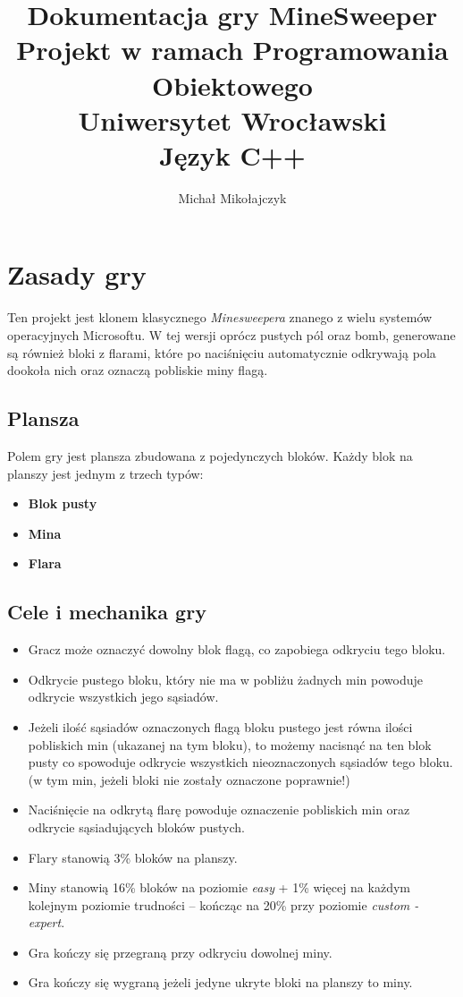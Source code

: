 \documentclass[12pt,a4paper]{article}
\begin{document}
\author{Michał Mikołajczyk}
\title{
	\textbf{Dokumentacja gry MineSweeper}\\
	\large Projekt w ramach Programowania Obiektowego\\
	\large Uniwersytet Wrocławski\\
	\large Język C++
	}

\maketitle

\tableofcontents
\newpage

\section{Zasady gry}
Ten projekt jest klonem klasycznego \textit{Minesweepera} znanego z wielu systemów operacyjnych Microsoftu. W tej wersji oprócz pustych pól oraz bomb, generowane są również bloki z flarami, które po naciśnięciu automatycznie odkrywają pola dookoła nich oraz oznaczą pobliskie miny flagą.
\subsection{Plansza}
Polem gry jest plansza zbudowana z pojedynczych bloków. Każdy blok na planszy jest jednym z trzech typów:
\begin{itemize}
\item \textbf{Blok pusty}
\item \textbf{Mina}
\item \textbf{Flara}
\end{itemize}

\subsection{Cele i mechanika gry}
\begin{itemize}
\item Gracz może oznaczyć dowolny blok flagą, co zapobiega odkryciu tego bloku.
\item Odkrycie pustego bloku, który nie ma w pobliżu żadnych min powoduje odkrycie wszystkich jego sąsiadów.
\item Jeżeli ilość sąsiadów oznaczonych flagą bloku pustego jest równa ilości pobliskich min (ukazanej na tym bloku), to możemy nacisnąć na ten blok pusty co spowoduje odkrycie wszystkich nieoznaczonych sąsiadów tego bloku. (w tym min, jeżeli bloki nie zostały oznaczone poprawnie!)
\item Naciśnięcie na odkrytą flarę powoduje oznaczenie pobliskich min oraz odkrycie sąsiadujących bloków pustych.
\item Flary stanowią 3\% bloków na planszy.
\item Miny stanowią 16\% bloków na poziomie \textit{easy} + 1\% więcej na każdym kolejnym poziomie trudności -- kończąc na 20\% przy poziomie \textit{custom - expert}.
\item Gra kończy się przegraną przy odkryciu dowolnej miny.
\item Gra kończy się wygraną jeżeli jedyne ukryte bloki na planszy to miny.
\end{itemize}
\end{document}
